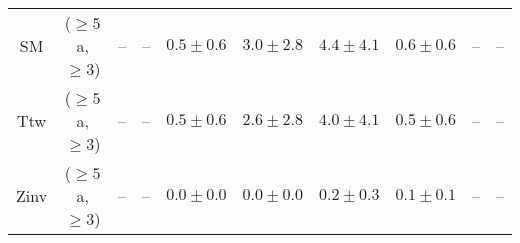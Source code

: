 \begin{table}[h!]
{\begin{tabular}{cccccccccc}
	SM & ($\ge5$a, $\ge3$) & -- & -- & $0.5\pm 0.6$ & $3.0\pm 2.8$ & $4.4\pm 4.1$ & $0.6\pm 0.6$ & -- & -- \\[0.5ex] 
	Ttw & ($\ge5$a, $\ge3$) & -- & -- & $0.5\pm 0.6$ & $2.6\pm 2.8$ & $4.0\pm 4.1$ & $0.5\pm 0.6$ & -- & -- \\[0.5ex] 
	Zinv & ($\ge5$a, $\ge3$) & -- & -- & $0.0\pm 0.0$ & $0.0\pm 0.0$ & $0.2\pm 0.3$ & $0.1\pm 0.1$ & -- & -- \\[0.5ex] 
	\hline
	\hline
\end{tabular}}
\end{table}
